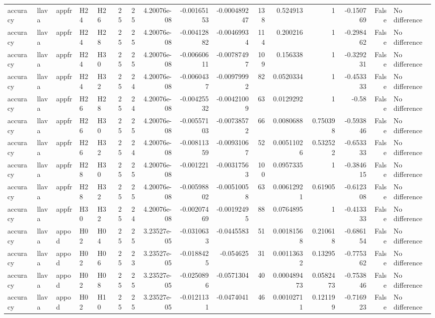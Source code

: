 \begin{longtable}{lllllrrrrrrrrrrl}
accuracy & llava & appfr & H24 & H26 & 25 & 25 & 4.20076e-08 & -0.00165153 & -0.000489247 & 138 & 0.524913 & 1 & -0.150769 & False & No difference \\
accuracy & llava & appfr & H24 & H28 & 25 & 25 & 4.20076e-08 & -0.00412882 & -0.00469934 & 114 & 0.200216 & 1 & -0.298462 & False & No difference \\
accuracy & llava & appfr & H24 & H30 & 25 & 25 & 4.20076e-08 & -0.00660611 & -0.00787497 & 109 & 0.156338 & 1 & -0.329231 & False & No difference \\
accuracy & llava & appfr & H24 & H32 & 25 & 24 & 4.20076e-08 & -0.0060437 & -0.00979992 & 82 & 0.0520334 & 1 & -0.453333 & False & No difference \\
accuracy & llava & appfr & H26 & H28 & 25 & 24 & 4.20076e-08 & -0.00425532 & -0.00421009 & 63 & 0.0129292 & 1 & -0.58 & False & No difference \\
accuracy & llava & appfr & H26 & H30 & 25 & 25 & 4.20076e-08 & -0.00557103 & -0.00738572 & 66 & 0.0080688 & 0.750398 & -0.593846 & False & No difference \\
accuracy & llava & appfr & H26 & H32 & 25 & 24 & 4.20076e-08 & -0.00811359 & -0.00931067 & 52 & 0.00511026 & 0.532522 & -0.653333 & False & No difference \\
accuracy & llava & appfr & H28 & H30 & 25 & 25 & 4.20076e-08 & -0.001221 & -0.00317563 & 100 & 0.0957335 & 1 & -0.384615 & False & No difference \\
accuracy & llava & appfr & H28 & H32 & 25 & 25 & 4.20076e-08 & -0.00598802 & -0.00510058 & 63 & 0.00612921 & 0.61905 & -0.612308 & False & No difference \\
accuracy & llava & appfr & H30 & H32 & 25 & 24 & 4.20076e-08 & -0.00207469 & -0.00192495 & 88 & 0.0764895 & 1 & -0.413333 & False & No difference \\
accuracy & llava & appod & H02 & H04 & 25 & 25 & 3.23527e-05 & -0.0310633 & -0.0445583 & 51 & 0.00181568 & 0.210618 & -0.686154 & False & No difference \\
accuracy & llava & appod & H02 & H06 & 25 & 23 & 3.23527e-05 & -0.0188425 & -0.054625 & 31 & 0.00113632 & 0.13295 & -0.775362 & False & No difference \\
accuracy & llava & appod & H02 & H08 & 25 & 25 & 3.23527e-05 & -0.0250896 & -0.0571304 & 40 & 0.000489473 & 0.0582473 & -0.753846 & False & No difference \\
accuracy & llava & appod & H02 & H10 & 25 & 25 & 3.23527e-05 & -0.0121131 & -0.0474041 & 46 & 0.00102711 & 0.121199 & -0.716923 & False & No difference \\

\end{longtable}
